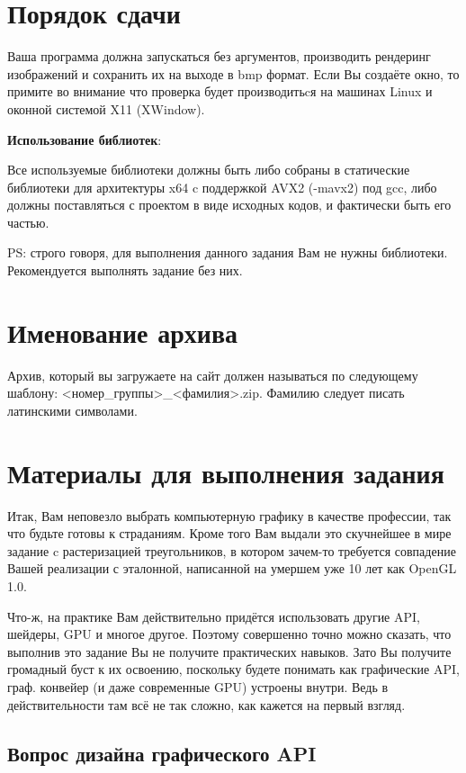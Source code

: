 \documentclass[12pt,subf,href,colorlinks=true]{article}
\begin{document}
\section{Порядок сдачи}
Ваша программа должна запускаться без аргументов, производить рендеринг изображений и сохранить их на выходе в bmp формат. Если Вы создаёте окно, то примите во внимание что проверка будет производитьcя на машинах Linux и оконной системой X11 (XWindow).
 
\noindent\textbf{Использование библиотек}: 

Все используемые библиотеки должны быть либо собраны в статические библиотеки для архитектуры x64 c поддержкой AVX2 (-mavx2) под gcc, либо должны поставляться с проектом в виде исходных кодов, и фактически быть его частью. 

PS: строго говоря, для выполнения данного задания Вам не нужны библиотеки. Рекомендуется выполнять задание без них. 

\section{Именование архива}

Архив, который вы загружаете на сайт должен называться по следующему шаблону: \newline <номер\_группы>\_<фамилия>.zip. Фамилию следует писать латинскими символами.

\section{Материалы для выполнения задания}\label{materials}

Итак, Вам неповезло выбрать компьютерную графику в качестве профессии, так что будьте готовы к страданиям. Кроме того Вам выдали это скучнейшее в мире задание c растеризацией треугольников, в котором зачем-то требуется совпадение Вашей реализации с эталонной, написанной на умершем уже 10 лет как OpenGL 1.0.

Что-ж, на практике Вам действительно придётся использовать другие API, шейдеры, GPU и многое другое. Поэтому совершенно точно можно сказать, что выполнив это задание Вы не получите практических навыков. Зато Вы получите громадный буст к их освоению, поскольку будете понимать как графические API, граф. конвейер (и даже современные GPU) устроены внутри. Ведь в действительности там всё не так сложно, как кажется на первый взгляд.

\subsection{Вопрос дизайна графического API}
\end{document}
